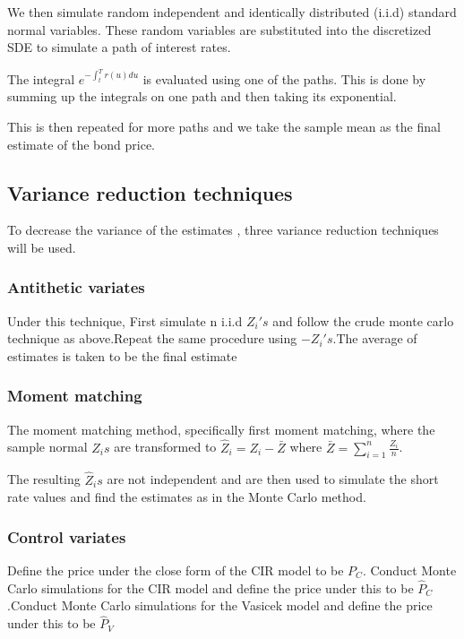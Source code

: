 \documentclass[12pt,a4paper]{article}
\begin{document}
We then simulate random independent and identically distributed (i.i.d) standard normal variables. These random variables are substituted into the discretized SDE to simulate a path of interest rates.
	
The integral $e^{-\int_{t}^{T} r(u)du}$ is evaluated using one of the paths. This is done by summing up the integrals on one path and then taking its exponential. 
	
This is then repeated for more paths and we take the sample mean as the final estimate of the bond price.
	 
	 


\subsection{Variance reduction techniques}

To decrease the variance of the estimates , three variance reduction techniques will be used. 


\subsubsection{Antithetic variates}

Under this technique, First simulate n i.i.d $Z_i's$ and follow the crude monte carlo technique as above.Repeat the same procedure using  $-Z_i's$.The average of estimates is taken to be the final estimate 


\subsubsection{Moment matching}
The moment matching method, specifically first moment matching, where the sample normal $Z_{i}s$ are transformed to $\hat{Z}_{i}=Z_{i}-\bar{Z}$ where $\bar{Z}=\sum_{i=1}^{n}\frac{Z_{i}}{n}$.

The resulting $\hat{Z}_{i}s$ are not independent and are then used to simulate the short rate values and find the estimates as in the Monte Carlo method.   

 
\subsubsection{Control variates}

Define the price under the close form of the CIR model to be $P_{C}$. Conduct Monte Carlo simulations for the CIR model and define the price under this to be $\hat{P}_{C}$.Conduct Monte Carlo simulations for the Vasicek model and define the price under this to be $\hat{P}_{V}$
\end{document}
